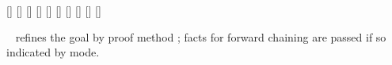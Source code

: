 \begin{isabellebody}
\begin{isamarkuptext}
  \begin{railoutput}
[]
\rail@bar
{}
[]
\rail@endbar
\rail@end
{}
[]
\rail@bar
{}
[]
\rail@endbar
\rail@end
{}
[]
[]
\rail@bar
{}
[]
\rail@endbar
\rail@end
{}
\rail@bar
{}[]
[]
[]
\rail@endbar
\rail@end
\end{railoutput}


  \begin{description}
  
  \item \hyperlink{command.proof}{\mbox{}}~ refines the goal by proof
  method ; facts for forward chaining are passed if so
  indicated by  mode.
  

\end{description}
\end{isamarkuptext}
\end{isabellebody}
